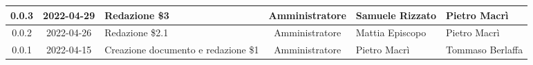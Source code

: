 \begin{center}
\begin{longtable}{ |c|c|p{8em}|c|m{5em}|m{6em}| }
		\hline
		0.0.3 & 2022-04-29 & Redazione \$3 & Amministratore & Samuele \newline Rizzato & Pietro \newline Macrì\\
		\hline
		0.0.2 & 2022-04-26 & Redazione \$2.1 & Amministratore & Mattia \newline Episcopo & Pietro \newline Macrì\\
		\hline
		0.0.1 & 2022-04-15 & Creazione documento e redazione \$1 & Amministratore & Pietro \newline Macrì & Tommaso \newline Berlaffa\\
		\hline
	\end{longtable}
	\end{center}
	\newpage